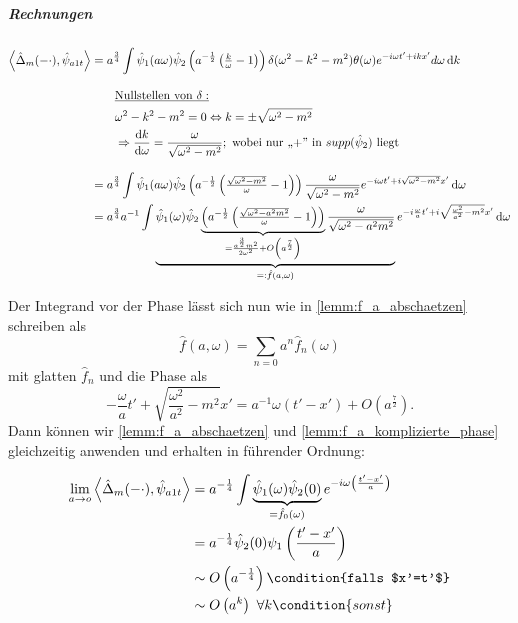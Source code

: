 \subparagraph*{Rechnungen}
\begin{align}
    \left<\hat \Delta_m(-\cdot), \hat \psi_{a1t}\right> &=
        a^{\frac{3}{4}} \int \hat \psi_1(a\omega)
        \hat\psi_2\left(a^{-\frac{1}{2}} \left(\tfrac{k}{\omega}-1\right)\right)
        \delta (\omega^2 - k^2 - m^2) \theta(\omega)
        e^{-i\omega t' + ikx'} d \omega \mathop{}\!\mathrm{d} k \nonumber \\[2ex]
        & \kern 2em \underline{\textrm{Nullstellen von $\delta$}:}
        \nonumber \\
        & \kern 2em \omega^2 - k^2 - m^2 = 0 \Leftrightarrow k = \pm \sqrt{\omega^2-m^2}
        \nonumber \\
        & \kern 2em \Rightarrow \frac{\mathop{}\!\mathrm{d} k}{\mathop{}\!\mathrm{d} \omega} = \frac{\omega}{\sqrt{\omega^2-m^2}}; \textrm{   wobei nur ,,+'' in $supp (\hat \psi_2)$ liegt}
        \nonumber \\[2ex]
        &= a^{\frac{3}{4}} \int \hat\psi_1(a \omega)
        \hat\psi_2\left(a^{-\frac{1}{2}} \left(\tfrac{\sqrt{\omega^2-m^2}}{\omega}-1\right)\right)
        \frac{\omega}{\sqrt{\omega^2-m^2}}
        e^{-i\omega t' + i \sqrt{\omega^2-m^2}x'}
        \mathop{}\!\mathrm{d} \omega \nonumber \\
        &= a^{\frac{3}{4}} a^{-1} \int
        \underbrace{\hat\psi_1(\omega)
                \hat\psi_2
                \underbrace{
                \left(
                    a^{-\frac{1}{2}} \left(\tfrac{\sqrt{\omega^2-a^2m^2}}{\omega}-1\right)
                \right)}_{= \frac{a^{\frac{3}{2}}m^2}{2 \omega^2}
                          + O\left(a^{\frac{7}{2}}\right)}
                \frac{\omega}{\sqrt{\omega^2-a^2 m^2}}}_{=: \hat f(a, \omega)}
                e^{-i\frac{\omega}{a} t' + i \sqrt{\frac{\omega^2}{a^2}-m^2}x'}
        \mathop{}\!\mathrm{d} \omega \nonumber
\end{align}

Der Integrand vor der Phase lässt sich nun wie in \cref{lemm:f_a_abschaetzen} schreiben als \[\hat f(a,\omega) = \sum_{n=0} a^n \hat f_n(\omega)\] mit glatten \(\hat f_n\) und die Phase als \[-\frac{\omega}{a}t' + \sqrt{\frac{\omega^2}{a^2} - m^2}x' = a^{-1} \omega (t'-x')  + O\left(a^{\frac{7}{2}}\right).\]
Dann können wir \cref{lemm:f_a_abschaetzen} und \cref{lemm:f_a_komplizierte_phase} gleichzeitig anwenden und erhalten in führender Ordnung:

\begin{align}
\lim_{a \to o}
\left\langle \hat\Delta_m(-\cdot), \hat\psi_{a1t}\right\rangle
&=
a^{-\frac{1}{4}} \int
\underbrace{{\hat \psi_1(\omega) \hat \psi_2 (0)}}_{= \hat f_0 (\omega)}
    e^{-i\omega \left(\frac{t'-x'}{a}\right)} \nonumber
\\ \nonumber &=
a^{-\frac{1}{4}} \hat \psi_2 (0) \psi_1\left(\frac{t'-x'}{a}\right)
\\ \nonumber &\sim
O\left(a^{-\frac{1}{4}}\right) \condition{falls $x'=t'$}
\\ &\sim O
\left(a^k\right) ~ \forall k  \condition{sonst}
\label{eq:delta_m_s=1}
\end{align}

